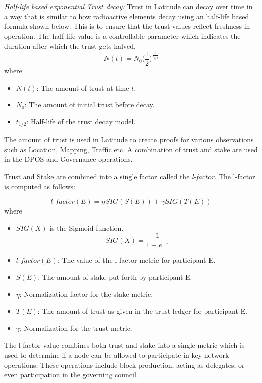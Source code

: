 \noindent
{\em Half-life based exponential Trust decay:}
Trust in Latitude can decay over time in a way that is similar to how radioactive elements decay
using an half-life based formula shown below. This is to ensure that the trust values reflect freshness in operation.
The half-life value is a controllable parameter which indicates the duration after which the trust gets halved.
\begin{equation*}
    \label{eq_trust_decay}
    N(t) = N_0 \bigg(\frac{1}{2}\bigg)^\frac{t}{t_{1/2}}
\end{equation*}
where 
\begin{itemize}
    \item $N(t)$: The amount of trust at time $t$.
    \item $N_0$: The amount of initial trust before decay.
    \item $t_{1/2}$: Half-life of the trust decay model.
\end{itemize}

The amount of trust is used in Latitude to create proofs for various observations such as Location, Mapping, Traffic
etc. A combination of trust and stake are used in the DPOS and Governance operations.

Trust and Stake are combined into a single factor called the {\em l-factor}. The l-factor is computed as follows:

\newcommand\LFACTOR{\mathit{\text{l-factor}}}
\newcommand\SIG{\mathit{\text{SIG}}}
\begin{equation*}
    \label{eq_l_factor}
    \LFACTOR(E) = \eta \SIG(S(E)) + \gamma \SIG(T(E))
\end{equation*}
where
\begin{itemize}
    \item $\SIG(X)$ is the Sigmoid function. \[ \SIG(X) = \frac{1}{1 + e^{-x}}\]
    \item $\LFACTOR(E)$: The value of the l-factor metric for participant E.
    \item $S(E)$: The amount of stake put forth by participant E.
    \item $\eta$: Normalization factor for the stake metric.
    \item $T(E)$: The amount of trust as given in the trust ledger for participant E.
    \item $\gamma$: Normalization for the trust metric.
\end{itemize}

The l-factor value combines both trust and stake into a single metric which is used to determine if a node can be
allowed to participate in key network operations. These operations include block production, acting as delegates, or
even participation in the governing council.

